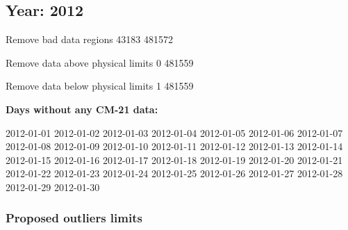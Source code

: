 \documentclass[
  10pt,
  a4paper,oneside]{article}
\begin{document}
\FloatBarrier

\newpage

\hypertarget{year-2012}{%
\subsection{Year: 2012}\label{year-2012}}

Remove bad data regions
43183 481572

Remove data above physical limits
0 481559

Remove data below physical limits
1 481559

\textbf{Days without any CM-21 data:}

2012-01-01 2012-01-02 2012-01-03 2012-01-04 2012-01-05 2012-01-06 2012-01-07 2012-01-08 2012-01-09 2012-01-10 2012-01-11 2012-01-12 2012-01-13 2012-01-14 2012-01-15 2012-01-16 2012-01-17 2012-01-18 2012-01-19 2012-01-20 2012-01-21 2012-01-22 2012-01-23 2012-01-24 2012-01-25 2012-01-26 2012-01-27 2012-01-28 2012-01-29 2012-01-30

\hypertarget{proposed-outliers-limits-19}{%
\subsubsection{Proposed outliers limits}\label{proposed-outliers-limits-19}}

\footnotesize
\end{document}
